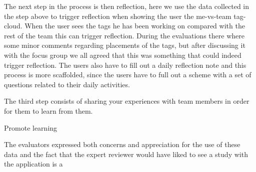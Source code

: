 The next step in the process is then reflection, here we use the data collected in the step above to trigger reflection when showing the user the me-vs-team tag-cloud. When the user sees the tags he has been working on compared with the rest of the team this can trigger reflection. During the evaluations there where some minor comments regarding placements of the tags, but after discussing it with the focus group we all agreed that this was something that could indeed trigger reflection. The users also have to fill out a daily reflection note and this process is more scaffolded, since the users have to full out a scheme with a set of questions related to their daily activities.

The third step consists of sharing your experiences with team members in order for them to learn from them.

Promote learning

The evaluators expressed both concerns and appreciation for the use of these data and the fact that the expert reviewer would have liked to see a study with the application is a 
